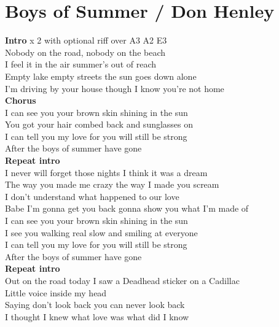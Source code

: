 \section{Boys of Summer / Don Henley}\label{sec:boysofsummer}
\Aminor
\Fmajor
\Gmajor
\Cmajor

\textbf{Intro}     x 2 with optional riff over A3 A2 E3\\
 Nobody on the road, nobody on the beach\\
 I feel it in the air summer’s out of reach\\
 Empty lake empty streets the sun goes down alone\\
 I’m driving by your house though I know you’re not home\\
\textbf{Chorus}\\
 I can see you  your brown skin shining in the sun\\
You got your hair combed back and  sunglasses on\\
 I can tell you my  love for you will still be strong \\
After the boys of  summer have gone\\
\textbf{Repeat intro}\\
 I never will forget those nights I think it was a dream\\
 The way you made me crazy the way I made you scream\\
 I don’t understand what happened to our love \\
Babe I’m gonna get you back gonna show you what I’m made of\\
 I can see you  your brown skin shining in the sun\\
I see you walking real slow and  smiling at everyone\\
 I can tell you my  love for you will still be strong\\
After the boys of  summer have gone\\
\textbf{Repeat intro}\\
 Out on the road today I saw a Deadhead sticker on a Cadillac\\
 Little voice inside my head\\
Saying don’t look back you can never look back\\
 I thought I knew what love was what did I know\\
